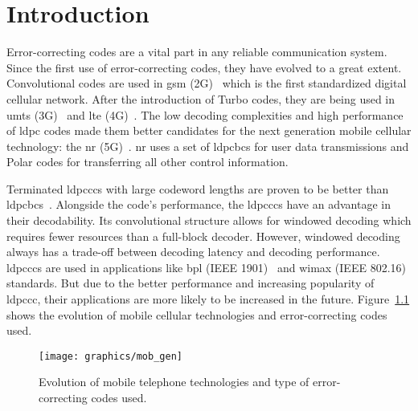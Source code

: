 \chapter{Introduction}
Error-correcting codes are a vital part in any reliable communication system. Since the first use of error-correcting codes, they have evolved to a great extent. Convolutional codes are used in \gls{gsm} (2G)~\cite{Gsm} which is the first standardized digital cellular network. After the introduction of Turbo codes, they are being used in \gls{umts} (3G)~\cite{3g} and \gls{lte} (4G)~\cite{Lte}. The low decoding complexities and high performance of \gls{ldpc} codes made them better candidates for the next generation mobile cellular technology: the \gls{nr} (5G)~\cite{Nra}. \gls{nr} uses a set of \glspl{ldpcbc} for user data transmissions and Polar codes for transferring all other control information.

Terminated \glspl{ldpccc} with large codeword lengths are proven to be better than \glspl{ldpcbc}~\cite{Huang2015}. Alongside the code's performance, the \glspl{ldpccc} have an advantage in their decodability. Its convolutional structure allows for windowed decoding which requires fewer resources than a full-block decoder. However, windowed decoding always has a trade-off between decoding latency and decoding performance. \glspl{ldpccc} are used in applications like \gls{bpl} (IEEE 1901)~\cite{Bpl} and \gls{wimax} (IEEE 802.16)~\cite{Wimax} standards. But due to the better performance and increasing popularity of \gls{ldpccc}, their applications are more likely to be increased in the future. Figure~\ref{fig:mob_gen} shows the evolution of mobile cellular technologies and error-correcting codes used.

\begin{figure}[htbp]
  \centering
  \texttt{[image: graphics/mob\_gen]}
  \caption[Evolution of mobile telephone technologies and error-correcting codes.]{Evolution of mobile telephone technologies and type of error-correcting codes used.}
  \label{fig:mob_gen}
\end{figure}



